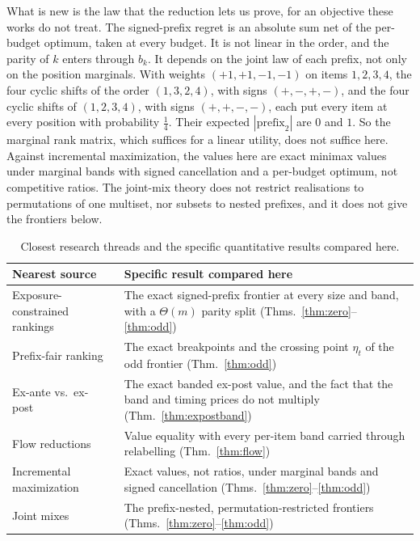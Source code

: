 What is new is the law that the reduction lets us prove, for an objective these works do not
treat. The signed-prefix regret is an absolute sum net of the per-budget optimum, taken at
every budget. It is not linear in the order, and the parity of $k$ enters through $b_{k}$. It
depends on the joint law of each prefix, not only on the position marginals. With weights
$(+1,+1,-1,-1)$ on items $1,2,3,4$, the four cyclic shifts of the order $(1,3,2,4)$, with signs
$(+,-,+,-)$, and the four cyclic shifts of $(1,2,3,4)$, with signs $(+,+,-,-)$, each put every item
at every position with probability $\frac14$. Their expected $|\text{prefix}_{2}|$ are $0$ and
$1$. So the marginal rank matrix, which suffices for a linear utility, does not
suffice here. Against incremental maximization, the values here are exact minimax values under
marginal bands with signed cancellation and a per-budget optimum, not competitive ratios. The
joint-mix theory does not restrict realisations to permutations of one multiset, nor subsets to
nested prefixes, and it does not give the frontiers below.

\begin{table}[h]
\caption{Closest research threads and the specific quantitative results compared here.}
\label{tab:prior}
\centering
\footnotesize
\begin{tabular}{@{}p{}p{}@{}}
\toprule
Nearest source & Specific result compared here \\
\midrule
Exposure-constrained rankings~\cite{singh2018} & The exact signed-prefix frontier at every
size and band, with a $\Theta(m)$ parity split (Thms.~\ref{thm:zero}--\ref{thm:odd}) \\
Prefix-fair ranking~\cite{celis2018} & The exact breakpoints and the crossing point
$\eta_{t}$ of the odd frontier (Thm.~\ref{thm:odd}) \\
Ex-ante vs.\ ex-post~\cite{singh2021,freeman2020} & The exact banded ex-post value, and the
fact that the band and timing prices do not multiply (Thm.~\ref{thm:expostband}) \\
Flow reductions~\cite{schrijver2003} & Value equality with every per-item band carried
through relabelling (Thm.~\ref{thm:flow}) \\
Incremental maximization~\cite{disser2023,bienkowski2026} & Exact values, not ratios, under
marginal bands and signed cancellation (Thms.~\ref{thm:zero}--\ref{thm:odd}) \\
Joint mixes~\cite{koike2022} & The prefix-nested, permutation-restricted frontiers
(Thms.~\ref{thm:zero}--\ref{thm:odd}) \\
\bottomrule
\end{tabular}
\end{table}

